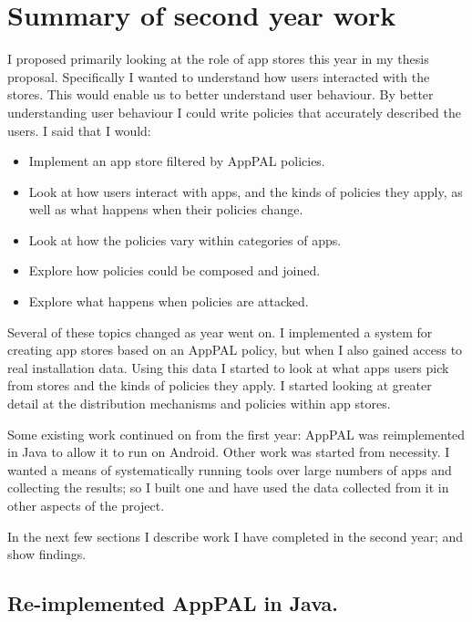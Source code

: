 \documentclass[a4paper]{scrartcl}
\begin{document}
\section{Summary of second year work}


I proposed primarily looking at the role of app stores this year in my thesis proposal.
Specifically I wanted to understand how users interacted with the stores.
This would enable us to better understand user behaviour.
By better understanding user behaviour I could write policies that accurately described the users.
I said that I would:
\begin{itemize}
  \item Implement an app store filtered by AppPAL policies.
  \item Look at how users interact with apps, and the kinds of policies they apply, as well as what happens when their policies change.
  \item Look at how the policies vary within categories of apps.
  \item Explore how policies could be composed and joined.
  \item Explore what happens when policies are attacked.
\end{itemize}

Several of these topics changed as year went on.
I implemented a system for creating app stores based on an AppPAL policy, but when I also gained access to real installation data.
Using this data I started to look at what apps users pick from stores and the kinds of policies they apply.
I started looking at greater detail at the distribution mechanisms and policies within app stores.

Some existing work continued on from the first year: AppPAL was reimplemented in Java to allow it to run on Android.
Other work was started from necessity.
I wanted a means of systematically running tools over large numbers of apps and collecting the results;
  so I built one and have used the data collected from it in other aspects of the project.

In the next few sections I describe work I have completed in the second year; and show findings.

\subsection{Re-implemented AppPAL in Java.}
\end{document}
